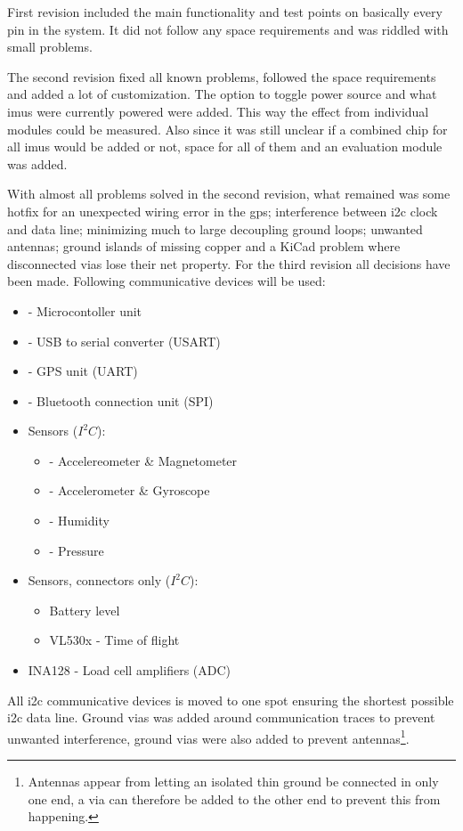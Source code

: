 First revision included the main functionality and test points on basically every pin in the system. It did not follow any space requirements and was riddled with small problems.

The second revision fixed all known problems, followed the space requirements and added a lot of customization. The option to toggle power source and what \gls{imu}s were currently powered were added. This way the effect from individual modules could be measured. Also since it was still unclear if a combined chip for all \gls{imu}s would be added or not, space for all of them and an evaluation module was added.

With almost all problems solved in the second revision, what remained was some hotfix for an unexpected wiring error in the \gls{gps}; interference between \gls{i2c} clock and data line; minimizing much to large decoupling ground loops; unwanted antennas; ground islands of missing copper and  a KiCad problem where disconnected \gls{via}s lose their net property.
For the third revision all decisions have been made. Following communicative devices will be used:
\begin{itemize}
\item{ - Microcontoller unit}
\item{ - USB to serial converter (USART)}
\item{ - GPS unit (UART)}
\item{ - Bluetooth connection unit (SPI)}
\item Sensors ($I^2C$):
	\begin{itemize}
	\item{ - Accelereometer \& Magnetometer}
	\item{ - Accelerometer \& Gyroscope}
	\item{ - Humidity}
	\item{ - Pressure}
	\end{itemize}
\item Sensors, connectors only ($I^2C$):
	\begin{itemize}
	\item Battery level
	\item VL530x \qquad- Time of flight
	\end{itemize}
\item INA128 \qquad- Load cell amplifiers (ADC)
\end{itemize}
All \gls{i2c} communicative devices is moved to one spot ensuring the shortest possible \gls{i2c} data line. Ground \gls{via}s was added around communication traces to prevent unwanted interference, ground \gls{via}s were also added to prevent antennas\footnote{Antennas appear from letting an isolated thin ground be connected in only one end, a \gls{via} can therefore be added to the other end to prevent this from happening.}.

